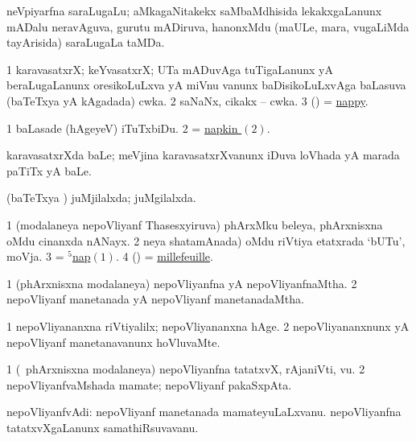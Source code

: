 \bentry
{}
\gl{\nA}
\bmng
neVpiyarfna saraLugaLu; aMkagaNitakekx saMbaMdhisida lekakxgaLanunx mADalu neravAguva, gurutu mADiruva, hanonxMdu (maULe, mara, \mo vugaLiMda tayArisida) saraLugaLa taMDa. 
\emng
\eentry

\bentry
{}
\gl{\nA}
\bmng
\bnum
\num{1} karavasatxrX; keYvasatxrX; UTa mADuvAga tuTigaLanunx yA beraLugaLanunx oresikoLuLxva yA miVnu \mo vanunx baDisikoLuLxvAga baLasuva (baTeTxya yA kAgadada) cwka. 
\hypertarget{napkin(2)}{} 
\num{2} saNaNx, cikakx -- cwka. 
\num{3} (\birx) = \hyperlink{nappy(1)}{nappy}. 
\enum
\emng

\noindent
\gl{\pagu}
\bmng
\bnum
\num{1}  baLasade (hAgeyeV) iTuTxbiDu. 
\num{2}  = \hyperlink{napkin(2)}{napkin \((2)\)}. 
\enum
\emng
\eentry

\bentry
{}
\gl{\nA}
\bmng
karavasatxrXda baLe; meVjina karavasatxrXvanunx iDuva loVhada yA marada paTiTx yA baLe. 
\emng
\eentry

\bentry
{}
\gl{\gu}
\bmng
(baTeTxya \vi) juMjilalxda; juMgilalxda. 
\emng
\eentry

\bentry
{}
\gl{\nA}
\bmng
\bnum
\num{1} (modalaneya nepoVliyanf Thasesxyiruva)  phArxMku beleya, phArxnisxna oMdu cinanxda nANayx. 
\num{2} neya shatamAnada) oMdu riVtiya etatxrada `bUTu', moVja. 
\num{3} = \hyperlink{nap(5)}{$^5$nap\((1)\)}. 
\num{4} (\ame) = \hyperref{kandict_m.pdf}{M}{millefeuille}{millefeuille}. 
\enum
\emng
\eentry

\bentry
{}
\gl{\gu}
\bmng
\bnum
\num{1} (phArxnisxna modalaneya) nepoVliyanfna yA nepoVliyanfnaMtha. 
\num{2} nepoVliyanf manetanada yA nepoVliyanf manetanadaMtha. 
\enum
\emng
\eentry

\bentry
{}
\gl{\kirxvi}
\bmng
\bnum
\num{1} nepoVliyananxna riVtiyalilx; nepoVliyananxna hAge. 
\num{2} nepoVliyananxnunx yA nepoVliyanf manetanavanunx hoVluvaMte. 
\enum
\emng
\eentry

\bentry
{}
\gl{\nA}
\bmng
\bnum
\num{1} (\kanmu\ phArxnisxna modalaneya) nepoVliyanfna tatatxvX, rAjaniVti, \mo vu. 
\num{2} nepoVliyanfvaMshada mamate; nepoVliyanf pakaSxpAta. 
\enum
\emng
\eentry

\bentry
{}
\gl{\nA}
\bmng
nepoVliyanfvAdi: 
\banum
{} nepoVliyanf manetanada mamateyuLaLxvanu. 
 nepoVliyanfna tatatxvXgaLanunx samathiRsuvavanu. 
\eanum
\emng
\eentry

